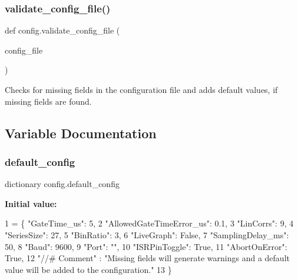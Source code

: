 \subsubsection{\texorpdfstring{validate\+\_\+config\+\_\+file()}{validate\_config\_file()}}
{\footnotesize\ttfamily def config.\+validate\+\_\+config\+\_\+file (\begin{DoxyParamCaption}\item[{}]{config\+\_\+file }\end{DoxyParamCaption})}

\begin{DoxyVerb}Checks for missing fields in the configuration file and adds default values, if missing fields are found.\end{DoxyVerb}
 

\subsection{Variable Documentation}
\mbox{\label{namespaceconfig_ac321195dcb6ced179a85db093e63a1c9}} 
\subsubsection{\texorpdfstring{default\+\_\+config}{default\_config}}
{\footnotesize\ttfamily dictionary config.\+default\+\_\+config}

{\bfseries Initial value\+:}
\begin{DoxyCode}
1 =   \{ \textcolor{stringliteral}{"GateTime\_us"}: 5,
2                     \textcolor{stringliteral}{"AllowedGateTimeError\_us"}: 0.1,
3                     \textcolor{stringliteral}{"LinCorrs"}: 9,
4                     \textcolor{stringliteral}{"SeriesSize"}: 27,
5                     \textcolor{stringliteral}{"BinRatio"}: 3,
6                     \textcolor{stringliteral}{"LiveGraph"}: \textcolor{keyword}{False},
7                     \textcolor{stringliteral}{"SamplingDelay\_ms"}: 50,
8                     \textcolor{stringliteral}{"Baud"}: 9600,
9                     \textcolor{stringliteral}{"Port"}: \textcolor{stringliteral}{""},
10                     \textcolor{stringliteral}{"ISRPinToggle"}: \textcolor{keyword}{True},
11                     \textcolor{stringliteral}{"AbortOnError"}: \textcolor{keyword}{True},
12                     \textcolor{stringliteral}{"//# Comment"}  : \textcolor{stringliteral}{"Missing fields will generate warnings and a default value will be
       added to the configuration."}
13                      \}
\end{DoxyCode}
